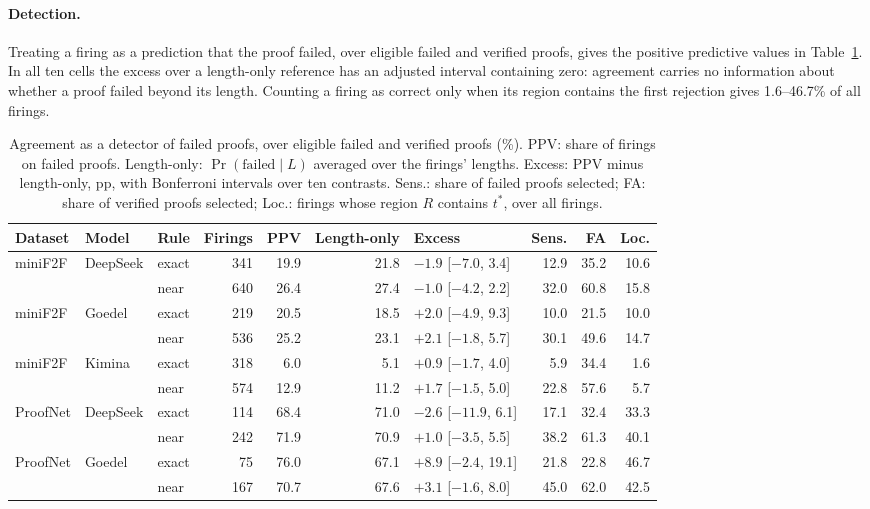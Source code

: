 \paragraph{Detection.} Treating a firing as a prediction that the proof failed, over eligible failed and verified proofs, gives the positive predictive values in Table~\ref{tab:detect}. In all ten cells the excess over a length-only reference has an adjusted interval containing zero: agreement carries no information about whether a proof failed beyond its length. Counting a firing as correct only when its region contains the first rejection gives 1.6--46.7\% of all firings.

\begin{table}[h]
\caption{Agreement as a detector of failed proofs, over eligible failed and verified proofs (\%). PPV: share of firings on failed proofs. Length-only: $\Pr(\text{failed}\mid L)$ averaged over the firings' lengths. Excess: PPV minus length-only, pp, with Bonferroni intervals over ten contrasts. Sens.: share of failed proofs selected; FA: share of verified proofs selected; Loc.: firings whose region $R$ contains $t^*$, over all firings.}
\label{tab:detect}
\begin{center}
\small
\setlength{\tabcolsep}{4pt}
\begin{tabular}{lllrrrlrrr}
\toprule
Dataset & Model & Rule & Firings & PPV & Length-only & Excess & Sens. & FA & Loc.\\
\midrule
miniF2F & DeepSeek & exact & 341 & 19.9 & 21.8 & $-1.9$ [$-7.0$, 3.4] & 12.9 & 35.2 & 10.6\\
 & & near & 640 & 26.4 & 27.4 & $-1.0$ [$-4.2$, 2.2] & 32.0 & 60.8 & 15.8\\
miniF2F & Goedel & exact & 219 & 20.5 & 18.5 & $+2.0$ [$-4.9$, 9.3] & 10.0 & 21.5 & 10.0\\
 & & near & 536 & 25.2 & 23.1 & $+2.1$ [$-1.8$, 5.7] & 30.1 & 49.6 & 14.7\\
miniF2F & Kimina & exact & 318 & 6.0 & 5.1 & $+0.9$ [$-1.7$, 4.0] & 5.9 & 34.4 & 1.6\\
 & & near & 574 & 12.9 & 11.2 & $+1.7$ [$-1.5$, 5.0] & 22.8 & 57.6 & 5.7\\
ProofNet & DeepSeek & exact & 114 & 68.4 & 71.0 & $-2.6$ [$-11.9$, 6.1] & 17.1 & 32.4 & 33.3\\
 & & near & 242 & 71.9 & 70.9 & $+1.0$ [$-3.5$, 5.5] & 38.2 & 61.3 & 40.1\\
ProofNet & Goedel & exact & 75 & 76.0 & 67.1 & $+8.9$ [$-2.4$, 19.1] & 21.8 & 22.8 & 46.7\\
 & & near & 167 & 70.7 & 67.6 & $+3.1$ [$-1.6$, 8.0] & 45.0 & 62.0 & 42.5\\
\bottomrule
\end{tabular}
\end{center}
\end{table}

